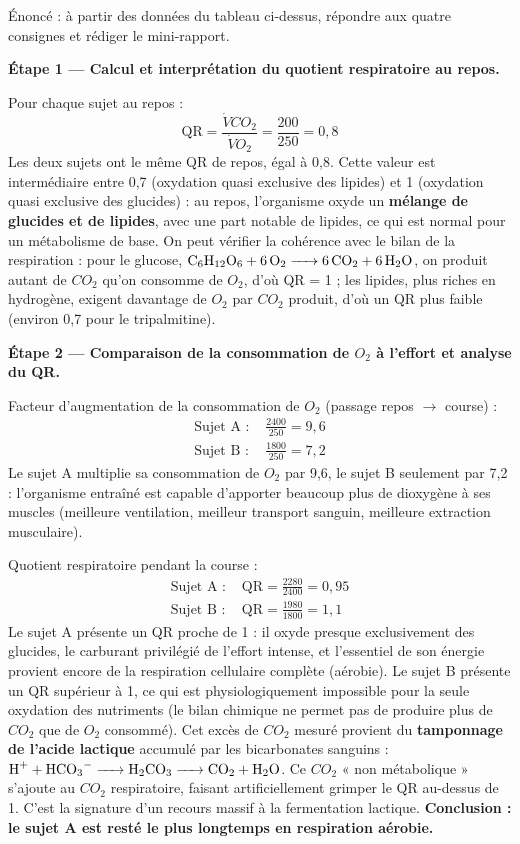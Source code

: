 \documentclass[11pt]{article}
\newcommand{\cle}[1]{{\popxbold\color{popdark}#1}}
\begin{document}
\begin{exoresolu}
Énoncé : à partir des données du tableau ci-dessus, répondre aux quatre consignes et rédiger le mini-rapport.

\tcblower

\textbf{Étape 1 — Calcul et interprétation du quotient respiratoire au repos.}

Pour chaque sujet au repos :
\[ \mathrm{QR} = \frac{\dot{V}CO_2}{\dot{V}O_2} = \frac{200}{250} = 0,8 \]
Les deux sujets ont le même QR de repos, égal à 0,8. Cette valeur est intermédiaire entre 0,7 (oxydation quasi exclusive des lipides) et 1 (oxydation quasi exclusive des glucides) : au repos, l'organisme oxyde un \textbf{mélange de glucides et de lipides}, avec une part notable de lipides, ce qui est normal pour un métabolisme de base. On peut vérifier la cohérence avec le bilan de la respiration : pour le glucose, $\ce{C6H12O6 + 6O2 -> 6CO2 + 6H2O}$, on produit autant de $CO_2$ qu'on consomme de $O_2$, d'où QR = 1 ; les lipides, plus riches en hydrogène, exigent davantage de $O_2$ par $CO_2$ produit, d'où un QR plus faible (environ 0,7 pour le tripalmitine).

\textbf{Étape 2 — Comparaison de la consommation de $O_2$ à l'effort et analyse du QR.}

Facteur d'augmentation de la consommation de $O_2$ (passage repos $\rightarrow$ course) :
\begin{align*}
\text{Sujet A : } & \frac{2400}{250} = 9,6 \\
\text{Sujet B : } & \frac{1800}{250} = 7,2
\end{align*}
Le sujet A multiplie sa consommation de $O_2$ par 9,6, le sujet B seulement par 7,2 : l'organisme entraîné est capable d'apporter beaucoup plus de dioxygène à ses muscles (meilleure ventilation, meilleur transport sanguin, meilleure extraction musculaire).

Quotient respiratoire pendant la course :
\begin{align*}
\text{Sujet A : } & \mathrm{QR} = \frac{2280}{2400} = 0,95 \\
\text{Sujet B : } & \mathrm{QR} = \frac{1980}{1800} = 1,1
\end{align*}
Le sujet A présente un QR proche de 1 : il oxyde presque exclusivement des \cle{glucides}, le carburant privilégié de l'effort intense, et l'essentiel de son énergie provient encore de la respiration cellulaire complète (aérobie).
Le sujet B présente un QR supérieur à 1, ce qui est physiologiquement impossible pour la seule oxydation des nutriments (le bilan chimique ne permet pas de produire plus de $CO_2$ que de $O_2$ consommé). Cet excès de $CO_2$ mesuré provient du \textbf{tamponnage de l'acide lactique} accumulé par les bicarbonates sanguins : $\ce{H+ + HCO3- -> H2CO3 -> CO2 + H2O}$. Ce $CO_2$ « non métabolique » s'ajoute au $CO_2$ respiratoire, faisant artificiellement grimper le QR au-dessus de 1. C'est la signature d'un recours massif à la fermentation lactique.
\textbf{Conclusion : le sujet A est resté le plus longtemps en respiration aérobie.}


\end{exoresolu}
\end{document}
